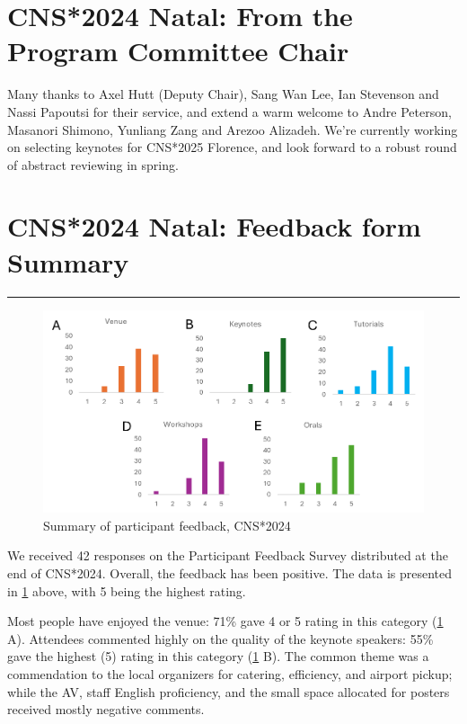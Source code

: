 \documentclass[11pt,a4paper,oneside]{article}
\begin{document}
\newpage
\section*{CNS*2024 Natal: From the Program Committee Chair}%
Many thanks to Axel Hutt (Deputy Chair), Sang Wan Lee, Ian Stevenson and Nassi Papoutsi for their service, and extend a warm welcome to Andre Peterson, Masanori Shimono, Yunliang Zang and Arezoo Alizadeh.
We're currently working on selecting keynotes for CNS*2025 Florence, and look forward to a robust round of abstract reviewing in spring.

\newpage


\newpage
\section*{CNS*2024 Natal: Feedback form Summary}%
\rule{\textwidth}{0.4pt}
\begin{figure}[h]
  \centering
  \includegraphics[width=\textwidth]{images/cns2024-feedback-form-summary}
  \caption{Summary of participant feedback, CNS*2024}%
  \label{fig:cns2024-summary}
\end{figure}

\noindent{}We received 42 responses on the Participant Feedback Survey distributed at the end of CNS*2024.
Overall, the feedback has been positive. The data is presented in \cref{fig:cns2024-summary} above, with 5 being the highest rating.

Most people have enjoyed the venue: 71\% gave 4 or 5 rating in this category (\cref{fig:cns2024-summary} A).
Attendees commented highly on the quality of the keynote speakers: 55\% gave the highest (5) rating in this category (\cref{fig:cns2024-summary} B).
The common theme was a commendation to the local organizers for catering, efficiency, and airport pickup; while the AV, staff English proficiency, and the small space allocated for posters received mostly negative comments.
\end{document}
